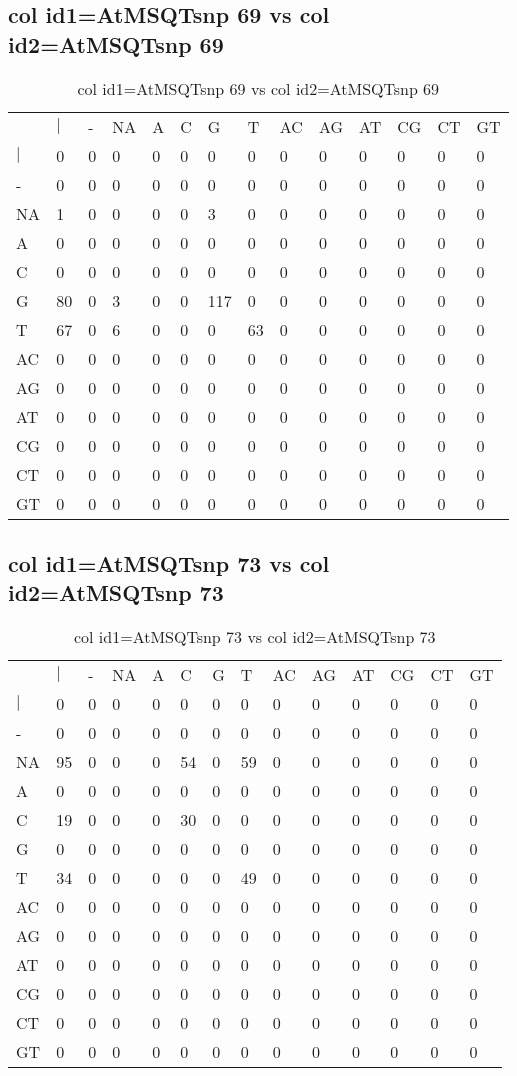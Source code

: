 \subsection{col id1=AtMSQTsnp 69 vs col id2=AtMSQTsnp 69}
\begin{center}
\begin{longtable}{|l|l|l|l|l|l|l|l|l|l|l|l|l|l|}
\caption{col id1=AtMSQTsnp 69 vs col id2=AtMSQTsnp 69} \label{table_dm956}\\
\hline
\\
\hline
&$|$&-&NA&A&C&G&T&AC&AG&AT&CG&CT&GT\\
$|$&0&0&0&0&0&0&0&0&0&0&0&0&0\\
-&0&0&0&0&0&0&0&0&0&0&0&0&0\\
NA&1&0&0&0&0&3&0&0&0&0&0&0&0\\
A&0&0&0&0&0&0&0&0&0&0&0&0&0\\
C&0&0&0&0&0&0&0&0&0&0&0&0&0\\
G&80&0&3&0&0&117&0&0&0&0&0&0&0\\
T&67&0&6&0&0&0&63&0&0&0&0&0&0\\
AC&0&0&0&0&0&0&0&0&0&0&0&0&0\\
AG&0&0&0&0&0&0&0&0&0&0&0&0&0\\
AT&0&0&0&0&0&0&0&0&0&0&0&0&0\\
CG&0&0&0&0&0&0&0&0&0&0&0&0&0\\
CT&0&0&0&0&0&0&0&0&0&0&0&0&0\\
GT&0&0&0&0&0&0&0&0&0&0&0&0&0\\
\hline
\end{longtable}
\end{center}

\subsection{col id1=AtMSQTsnp 73 vs col id2=AtMSQTsnp 73}
\begin{center}
\begin{longtable}{|l|l|l|l|l|l|l|l|l|l|l|l|l|l|}
\caption{col id1=AtMSQTsnp 73 vs col id2=AtMSQTsnp 73} \label{table_dm958}\\
\hline
\\
\hline
&$|$&-&NA&A&C&G&T&AC&AG&AT&CG&CT&GT\\
$|$&0&0&0&0&0&0&0&0&0&0&0&0&0\\
-&0&0&0&0&0&0&0&0&0&0&0&0&0\\
NA&95&0&0&0&54&0&59&0&0&0&0&0&0\\
A&0&0&0&0&0&0&0&0&0&0&0&0&0\\
C&19&0&0&0&30&0&0&0&0&0&0&0&0\\
G&0&0&0&0&0&0&0&0&0&0&0&0&0\\
T&34&0&0&0&0&0&49&0&0&0&0&0&0\\
AC&0&0&0&0&0&0&0&0&0&0&0&0&0\\
AG&0&0&0&0&0&0&0&0&0&0&0&0&0\\
AT&0&0&0&0&0&0&0&0&0&0&0&0&0\\
CG&0&0&0&0&0&0&0&0&0&0&0&0&0\\
CT&0&0&0&0&0&0&0&0&0&0&0&0&0\\
GT&0&0&0&0&0&0&0&0&0&0&0&0&0\\
\hline
\end{longtable}
\end{center}

